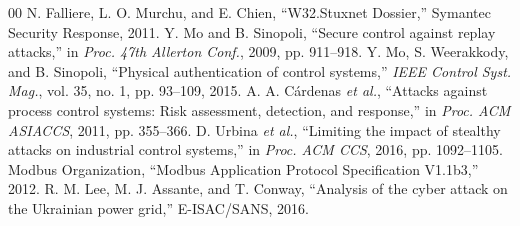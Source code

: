 \documentclass[11pt,a4paper]{article}
\begin{document}
\begin{thebibliography}{00}
 N. Falliere, L. O. Murchu, and E. Chien, ``W32.Stuxnet Dossier,'' Symantec Security Response, 2011.
 Y. Mo and B. Sinopoli, ``Secure control against replay attacks,'' in \textit{Proc. 47th Allerton Conf.}, 2009, pp. 911--918.
 Y. Mo, S. Weerakkody, and B. Sinopoli, ``Physical authentication of control systems,'' \textit{IEEE Control Syst. Mag.}, vol. 35, no. 1, pp. 93--109, 2015.
 A. A. C\'ardenas \textit{et al.}, ``Attacks against process control systems: Risk assessment, detection, and response,'' in \textit{Proc. ACM ASIACCS}, 2011, pp. 355--366.
 D. Urbina \textit{et al.}, ``Limiting the impact of stealthy attacks on industrial control systems,'' in \textit{Proc. ACM CCS}, 2016, pp. 1092--1105.
 Modbus Organization, ``Modbus Application Protocol Specification V1.1b3,'' 2012.
 R. M. Lee, M. J. Assante, and T. Conway, ``Analysis of the cyber attack on the Ukrainian power grid,'' E-ISAC/SANS, 2016.
\end{thebibliography}
\end{document}
